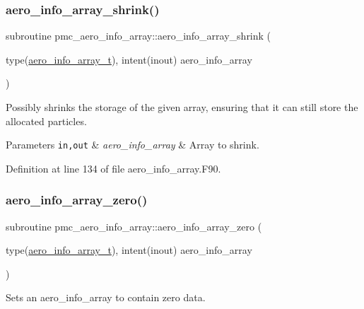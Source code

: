 \subsubsection{\texorpdfstring{aero\+\_\+info\+\_\+array\+\_\+shrink()}{aero\_info\_array\_shrink()}}
{\footnotesize\ttfamily subroutine pmc\+\_\+aero\+\_\+info\+\_\+array\+::aero\+\_\+info\+\_\+array\+\_\+shrink (\begin{DoxyParamCaption}\item[{type(\mbox{\hyperlink{structpmc__aero__info__array_1_1aero__info__array__t}{aero\+\_\+info\+\_\+array\+\_\+t}}), intent(inout)}]{aero\+\_\+info\+\_\+array }\end{DoxyParamCaption})}



Possibly shrinks the storage of the given array, ensuring that it can still store the allocated particles. 


\begin{DoxyParams}[1]{Parameters}
\mbox{\tt in,out}  & {\em aero\+\_\+info\+\_\+array} & Array to shrink. \\
\hline
\end{DoxyParams}


Definition at line 134 of file aero\+\_\+info\+\_\+array.\+F90.

\mbox{\label{namespacepmc__aero__info__array_aceb12e9f541f4df8ab3c5d4a37e75072}} 
\subsubsection{\texorpdfstring{aero\+\_\+info\+\_\+array\+\_\+zero()}{aero\_info\_array\_zero()}}
{\footnotesize\ttfamily subroutine pmc\+\_\+aero\+\_\+info\+\_\+array\+::aero\+\_\+info\+\_\+array\+\_\+zero (\begin{DoxyParamCaption}\item[{type(\mbox{\hyperlink{structpmc__aero__info__array_1_1aero__info__array__t}{aero\+\_\+info\+\_\+array\+\_\+t}}), intent(inout)}]{aero\+\_\+info\+\_\+array }\end{DoxyParamCaption})}



Sets an aero\+\_\+info\+\_\+array to contain zero data. 



